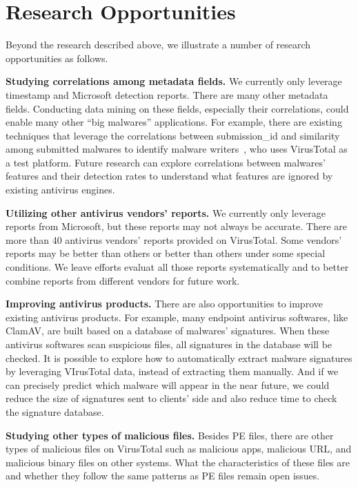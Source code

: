 \section{Research Opportunities}
\label{sec:oppo}

Beyond the research described above, we illustrate a number of research opportunities as follows.

{\bf Studying correlations among metadata fields.} 
We currently only leverage timestamp and Microsoft detection reports. 
There are many other metadata fields. 
Conducting data mining on these fields, especially their correlations, could enable 
many other ``big malwares'' applications. 
For example, there are existing techniques that leverage the correlations between submission\_id and similarity among submitted malwares to identify malware writers~\cite{neeles}, 
who uses VirusTotal as a test platform. 
Future research can explore correlations between malwares’ features and their detection rates to understand what features are ignored by existing antivirus engines. 

{\bf Utilizing other antivirus vendors' reports.}
We currently only leverage reports from Microsoft, but these reports may not always be accurate.
There are more than 40 antivirus vendors' reports provided on VirusTotal.
Some vendors’ reports may be better than others or better than others under some special conditions. 
We leave efforts evaluat all those reports systematically and to better combine reports from different vendors for future work. 

{\bf Improving antivirus products.} 
There are also opportunities to improve existing antivirus products. 
For example, many endpoint antivirus softwares, like ClamAV, are built based on a database of malwares' signatures. 
When these antivirus softwares scan suspicious files, all signatures in the database will be checked. 
It is possible to explore how to automatically extract malware signatures by leveraging VIrusTotal data, instead of extracting them manually.
And if we can precisely predict which malware will appear in the near future, 
we could reduce the size of signatures sent to clients' side and also reduce time to check the signature database. 


{\bf Studying other types of malicious files. }
Besides PE files, there are other types of malicious files on VirusTotal such as malicious apps, 
malicious URL, and malicious binary files on other systems. 
What the characteristics of these files are and whether they follow the same patterns as PE files remain open issues.  

